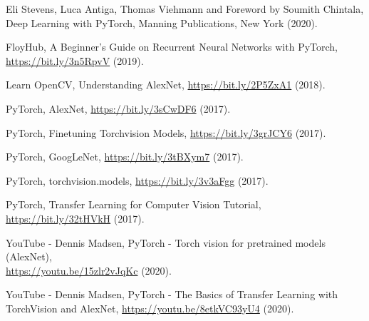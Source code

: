 \documentclass[a4paper]{article}
\begin{document}
\begin{thebibliography}{80}

     Eli Stevens, Luca Antiga, Thomas Viehmann and Foreword by Soumith Chintala, Deep Learning with PyTorch, Manning Publications, New York (2020).

     FloyHub, A Beginner’s Guide on Recurrent Neural Networks with PyTorch, \href{https://bit.ly/3n5RpvV}{https://bit.ly/3n5RpvV} (2019).
    
     Learn OpenCV, Understanding AlexNet, \href{https://bit.ly/2P5ZxA1}{https://bit.ly/2P5ZxA1} (2018).

     PyTorch, AlexNet, \href{https://bit.ly/3sCwDF6}{https://bit.ly/3sCwDF6} (2017).
    
     PyTorch, Finetuning Torchvision Models, \href{https://bit.ly/3grJCY6}{https://bit.ly/3grJCY6} (2017).
    
     PyTorch, GoogLeNet, \href{https://bit.ly/3tBXym7}{https://bit.ly/3tBXym7} (2017).
    
     PyTorch, torchvision.models, \href{https://bit.ly/3v3aFgg}{https://bit.ly/3v3aFgg} (2017).
    
     PyTorch, Transfer Learning for Computer Vision Tutorial, \href{https://bit.ly/32tHVkH}{https://bit.ly/32tHVkH} (2017).
    
     YouTube - Dennis Madsen, PyTorch - Torch vision for pretrained models (AlexNet),\\\href{https://youtu.be/15zlr2vJqKc}{https://youtu.be/15zlr2vJqKc} (2020).
    
     YouTube - Dennis Madsen, PyTorch - The Basics of Transfer Learning with TorchVision and AlexNet, \href{https://youtu.be/8etkVC93yU4}{https://youtu.be/8etkVC93yU4} (2020).
\end{thebibliography}
\end{document}
